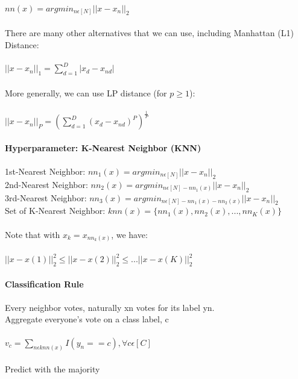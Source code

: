 \documentclass{article}
\begin{document}
\paragraph{}
\(nn(x) = argmin_{n\epsilon[N]}||x-x_n||_2\)\\\\
There are many other alternatives that we can use, including Manhattan (L1) Distance:
\paragraph{}
\(||x-x_n||_1=\sum_{d=1}^D|x_d-x_{nd}|\)\\\\
More generally, we can use LP distance (for \(p \geq 1\)):
\paragraph{}
\(||x-x_n||_P=(\sum_{d=1}^D(x_d-x_{nd})^P)^{\frac{1}{P}}\)
\paragraph{Hyperparameter: K-Nearest Neighbor (KNN)}
\paragraph{}
1st-Nearest Neighbor: \(nn_1(x)=argmin_{n\epsilon[N]}||x-x_n||_2\)\\
2nd-Nearest Neighbor: \(nn_2(x)=argmin_{n\epsilon[N]-nn_1(x)}||x-x_n||_2\)\\
3rd-Nearest Neighbor: \(nn_3(x)=argmin_{n\epsilon[N]-nn_1(x)-nn_2(x)}||x-x_n||_2\)\\
Set of K-Nearest Neighbor: \(knn(x)=\{nn_1(x), nn_2(x),..., nn_K(x)\}\)\\\\
Note that with \(x_k=x_{nn_k(x)}\), we have:\\\\
\(||x-x(1)||_2^2\leq||x-x(2)||_2^2\leq...||x-x(K)||_2^2\)
\paragraph{Classification Rule}
\paragraph{}
Every neighbor votes, naturally xn votes for its label yn.\\
Aggregate everyone's vote on a class label, c
\paragraph{}
\(v_c=\sum_{n\epsilon knn(x)} I(y_n==c), \forall c \epsilon[C]\)\\\\
Predict with the majority
\end{document}
